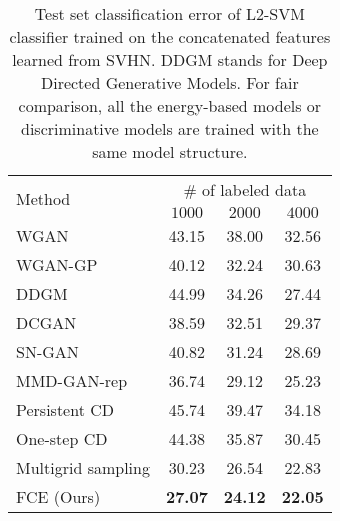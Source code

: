 \documentclass[10pt,twocolumn,letterpaper]{article}
\begin{document}
\begin{table}
\centering
 \caption{Test set classification error of L2-SVM classifier trained on the concatenated features learned from SVHN. DDGM stands for Deep Directed Generative Models. For fair comparison, all the energy-based models or discriminative models are trained with the same model structure. }
 \footnotesize
  \begin{tabular}{lccc}
    \toprule
     \multirow{2}{*}{Method}   & \multicolumn{3}{c}{\# of labeled data} \\
     & $1000$ & $2000$ & $4000$\\
        \midrule
     WGAN \cite{wasserstein}       &43.15 & 38.00& 32.56\\
     WGAN-GP \cite{gulrajani2017improved} & 40.12 & 32.24 & 30.63 \\
     DDGM \cite{kim2016deep} &44.99& 34.26& 27.44\\
     DCGAN \cite{radford2015unsupervised} &   38.59 & 32.51 & 29.37\\
     SN-GAN \cite{miyato2018spectral} &40.82 & 31.24 & 28.69 \\
     MMD-GAN-rep \cite{wang2018improving} & 36.74 & 29.12 & 25.23 \\
     \midrule
     Persistent CD \cite{tieleman2008training} & 45.74 & 39.47 & 34.18 \\
     One-step CD \cite{hinton2002training} & 44.38 & 35.87 & 30.45 \\
     Multigrid sampling \cite{gao2018learning} & 30.23 & 26.54 & 22.83 \\
     \midrule
     FCE (Ours) & {\bf 27.07} & {\bf 24.12} & {\bf 22.05}\\
        \bottomrule
    \end{tabular}
    \label{tabl: feature}
\end{table}
\end{document}
